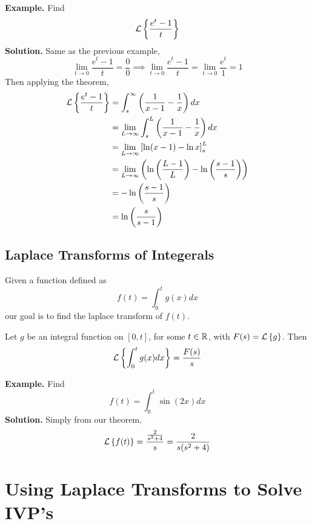 \documentclass[openany]{report}
\begin{document}
\noindent
\textbf{Example.} Find 
\[\mathcal{L}\left\{\frac{e^t - 1}{t}\right\}\]
\textbf{Solution.} Same as the previous example, 
\[\lim_{t\rightarrow 0} \frac{e^t - 1}{t} = \frac{0}{0} \implies \lim_{t\rightarrow 0}\frac{e^{t}-1}{t} = \lim_{t\rightarrow 0}\frac{e^t}{1} = 1\]
Then applying the theorem, 
\begin{align*}
    \mathcal{L}\left\{\frac{e^t - 1}{t}\right\} &= \int_s^\infty \left(\frac{1}{x-1} -  \frac{1}{x}\right)dx\\
    &= \lim_{L\rightarrow \infty} \int_s^L \left(\frac{1}{x-1} - \frac{1}{x}\right)dx\\
    &= \lim_{L\rightarrow\infty}\left[\ln(x-1) - \ln x\right]_s^L\\
    &= \lim_{L \rightarrow \infty} \left(\ln\left(\frac{L-1}{L}\right) - \ln\left(\frac{s-1}{s}\right)\right)\\
    &= - \ln\left(\frac{s-1}{s}\right)\\
    &= \ln\left(\frac{s}{s-1}\right)
\end{align*}

\subsection{Laplace Transforms of Integerals}
Given a function defined as 
\[f(t) = \int_0^t g(x)dx\]
our goal is to find the laplace transform of $f(t)$. 

\begin{theorem}
    Let $g$ be an integral function on $[0,t]$, for some $t \in \mathbb{R}$, with $F(s) = \mathcal{L}\left\{g\right\}$. Then 
    \[\mathcal{L}\left\{\int_0^t g(x)dx\right\} = \frac{F(s)}{s} \] 
\end{theorem}

\noindent
\textbf{Example.} Find 
\[f(t) = \int_0^t \sin(2x)dx\]
\textbf{Solution.} Simply from our theorem, 
\[\mathcal{L}\left\{f(t)\right\} = \frac{\frac{2}{s^2+4}}{s} = \frac{2}{s(s^2+4)}\]

\section{Using Laplace Transforms to Solve IVP's}
\end{document}

